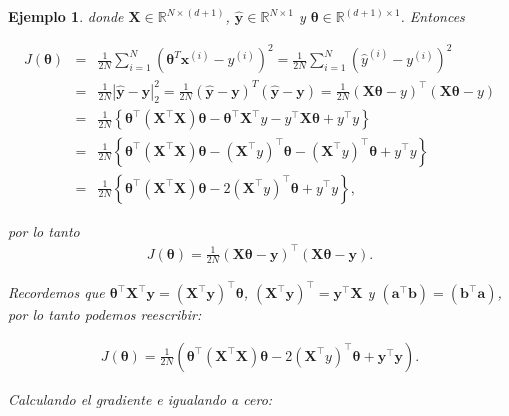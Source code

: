 \documentclass[12pt]{article}
\newtheorem{Ejem}{Ejemplo}%
\begin{document}
\begin{Ejem}
donde $\mathbf{X} \in \mathbb{R}^{N \times (d+1)}$, $\hat{\mathbf{y}} \in \mathbb{R}^{N \times 1}$ y $\mathbf{\theta} \in \mathbb{R}^{(d+1) \times 1}$. Entonces

\begin{eqnarray*}
J(\mathbf{\theta}) &=& \frac{1}{2N} \sum_{i=1}^{N} \left( \mathbf{\theta}^{T} \mathbf{x}^{(i)} - y^{(i)} \right)^2 = \frac{1}{2N} \sum_{i=1}^{N} \left( \hat{y}^{(i)} - y^{(i)} \right)^2\\
&=& \frac{1}{2N} | \hat{\mathbf{y}} - \mathbf{y} |_2^2 = \frac{1}{2N} (\hat{\mathbf{y}} - \mathbf{y})^{T} (\hat{\mathbf{y}} - \mathbf{y})=\frac{1}{2N}\left(\mathbf{X}\mathbf{\theta}-y\right)^{\top}\left(\mathbf{X}\mathbf{\theta}-y\right)\\
&=&\frac{1}{2N}\left\{\mathbf{\theta}^{\top}\left(\mathbf{X}^{\top}\mathbf{X}\right)\mathbf{\theta}-\mathbf{\theta}^{\top}\mathbf{X}^{\top}y-y^{\top}\mathbf{X}\mathbf{\theta}+y^{\top}y\right\}\\
&=&\frac{1}{2N}\left\{\mathbf{\theta}^{\top}\left(\mathbf{X}^{\top}\mathbf{X}\right)\mathbf{\theta}-\left(\mathbf{X}^{\top}y\right)^{\top}\mathbf{\theta}-\left(\mathbf{X}^{\top}y\right)^{\top}\mathbf{\theta}+y^{\top}y\right\}\\
&=&\frac{1}{2N}\left\{\mathbf{\theta}^{\top}\left(\mathbf{X}^{\top}\mathbf{X}\right)\mathbf{\theta}-2\left(\mathbf{X}^{\top}y\right)^{\top}\mathbf{\theta}+y^{\top}y\right\},
\end{eqnarray*}

por lo tanto
\begin{eqnarray*}
J(\mathbf{\theta}) = \frac{1}{2N} (\mathbf{X} \mathbf{\theta} - \mathbf{y})^{\top} (\mathbf{X} \mathbf{\theta} - \mathbf{y}).
\end{eqnarray*}

Recordemos que $\mathbf{\theta}^{\top} \mathbf{X}^{\top} \mathbf{y} = (\mathbf{X}^{\top} \mathbf{y})^{\top} \mathbf{\theta}$, $(\mathbf{X}^{\top} \mathbf{y})^{\top} = \mathbf{y}^{\top} \mathbf{X}$ y $(\mathbf{a}^{\top} \mathbf{b}) = (\mathbf{b}^{\top} \mathbf{a})$, por lo tanto podemos reescribir:

\begin{eqnarray*}
J(\mathbf{\theta}) = \frac{1}{2N}\left( \mathbf{\theta}^{\top}\left(\mathbf{X}^{\top}\mathbf{X}\right)\mathbf{\theta}- 2\left(\mathbf{X}^{\top}y\right)^{\top}\mathbf{\theta}+ \mathbf{y}^{\top}\mathbf{y}\right).
\end{eqnarray*}

Calculando el gradiente e igualando a cero:


\end{Ejem}
\end{document}
